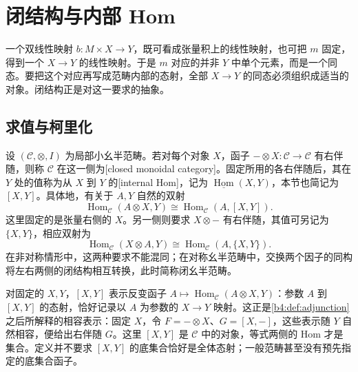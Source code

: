 
\section{闭结构与内部 Hom}
\label{b4:sec:monoidal-closed}

一个双线性映射 \(b:M\times X\to Y\)，既可看成张量积上的线性映射，也可把 \(m\) 固定，得到一个 \(X\to Y\) 的线性映射。于是 \(m\) 对应的并非 \(Y\) 中单个元素，而是一个同态。要把这个对应再写成范畴内部的态射，全部 \(X\to Y\) 的同态必须组织成适当的对象。闭结构正是对这一要求的抽象。

\subsection{求值与柯里化}
\label{b4:subsec:closed-evaluation}

\begin{definition}\label{b4:def:closed-monoidal-category}
	设 \((\mathcal C,\otimes,I)\) 为局部小幺半范畴。若对每个对象 \(X\)，函子 \(-\otimes X:\mathcal C\to\mathcal C\) 有右伴随，则称 \(\mathcal C\) 在这一侧为[closed monoidal category]。固定所用的各右伴随后，其在 \(Y\) 处的值称为从 \(X\) 到 \(Y\) 的[internal Hom]，记为 \(\underline{\operatorname{Hom}}(X,Y)\)，本节也简记为 \([X,Y]\)。具体地，有关于 \(A,Y\) 自然的双射
	\begin{equation}\label{b4:eq:closed-adjunction}
		\operatorname{Hom}_{\mathcal C}(A\otimes X,Y) \cong\operatorname{Hom}_{\mathcal C}(A,[X,Y]).
	\end{equation}
	这里固定的是张量右侧的 \(X\)。另一侧则要求 \(X\otimes-\) 有右伴随，其值可另记为 \(\{X,Y\}\)，相应双射为
	\[
		\operatorname{Hom}_{\mathcal C}(X\otimes A,Y) \cong\operatorname{Hom}_{\mathcal C}(A,\{X,Y\}).
	\]
	在非对称情形中，这两种要求不能混同；在对称幺半范畴中，交换两个因子的同构将左右两侧的闭结构相互转换，此时简称闭幺半范畴。
\end{definition}

对固定的 \(X,Y\)，\([X,Y]\) 表示反变函子 \(A\mapsto\operatorname{Hom}_{\mathcal C}(A\otimes X,Y)\)：参数 \(A\) 到 \([X,Y]\) 的态射，恰好记录以 \(A\) 为参数的 \(X\to Y\) 映射。这正是\cref{b4:def:adjunction}之后所解释的相容表示：固定 \(X\)，令 \(F=-\otimes X\)、\(G=[X,-]\)，这些表示随 \(Y\) 自然相容，便给出右伴随 \(G\)。这里 \([X,Y]\) 是 \(\mathcal C\) 中的对象，等式两侧的 Hom 才是集合。定义并不要求 \([X,Y]\) 的底集合恰好是全体态射；一般范畴甚至没有预先指定的底集合函子。

